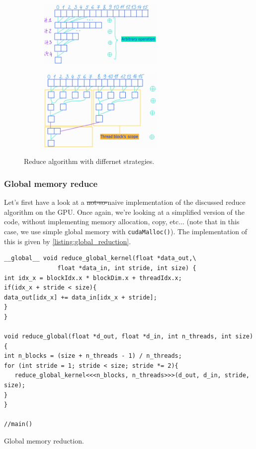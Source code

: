 \begin{figure}
   \centering
   \begin{subfigure}[t]{0.45\textwidth}
        \centering
        \includegraphics[width=6cm]{pngs/reduce_global.jpg}
        \label{fig:static}
    \end{subfigure}
    \begin{subfigure}[t]{0.45\textwidth}
        \centering
        \includegraphics[width=6cm]{pngs/reduce_shared.jpg}
        \label{fig:dynamic}
    \end{subfigure}
\label{fig:reduce}
    \caption{Reduce algorithm with differnet strategies.}
\end{figure}

\subsubsection*{Global memory reduce}
Let's first have a look at a \sout{not-so-}naive implementation of the discussed reduce algorithm on the GPU.
Once again, we're looking at a simplified version of the code, without implementing memory allocation, copy, etc... 
(note that in this case, we use simple global memory with \verb|cudaMalloc()|). The implementation of this is given by \autoref{listing:global_reduction}.


\begin{listing}
\begin{verbatim}
__global__ void reduce_global_kernel(float *data_out,\
               float *data_in, int stride, int size) {
int idx_x = blockIdx.x * blockDim.x + threadIdx.x;
if(idx_x + stride < size){
data_out[idx_x] += data_in[idx_x + stride];
}
}

void reduce_global(float *d_out, float *d_in, int n_threads, int size) {
int n_blocks = (size + n_threads - 1) / n_threads;
for (int stride = 1; stride < size; stride *= 2){
   reduce_global_kernel<<<n_blocks, n_threads>>>(d_out, d_in, stride, size);
}
}

//main()
\end{verbatim}
    \caption{Global memory reduction. \cite{tuomanen2018hands}}
    \label{listing:global_reduction}
\end{listing}

